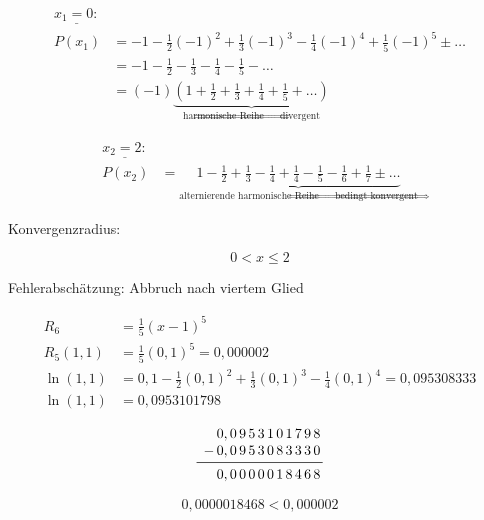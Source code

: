 \begin{align*}
    \underline{x_1 = 0:} \\
    P(x_1) &= -1 - \frac{1}{2} {(-1)}^2 + \frac{1}{3} {(-1)}^3 - \frac{1}{4} {(-1)}^4 + \frac{1}{5} {(-1)}^5 \pm \ldots \\
    &= -1 - \frac{1}{2} - \frac{1}{3} - \frac{1}{4} - \frac{1}{5} - \ldots \\
    &= (-1) \underbrace{\left( 1 + \frac{1}{2} + \frac{1}{3} + \frac{1}{4} + \frac{1}{5} + \ldots \right)}_{\text{harmonische Reihe \(\Rightarrow\) divergent}}
\end{align*}

\begin{align*}
    \underline{x_2 = 2:} \\
    P(x_2) &= \underbrace{1 - \frac{1}{2} + \frac{1}{3} - \frac{1}{4} + \frac{1}{4} - \frac{1}{5} - \frac{1}{6} + \frac{1}{7} \pm \ldots}_{\text{alternierende harmonische Reihe \(\Rightarrow\) bedingt konvergent}}
\end{align*}

Konvergenzradius:

\[
    0 < x \leq 2
\]

Fehlerabschätzung: Abbruch nach viertem Glied

\begin{align*}
    R_6 &= \frac{1}{5} {(x - 1)}^5 \\
    R_5(1,1) &= \frac{1}{5} {(0,1)}^5 = 0,000002 \\
    \ln (1,1) &= 0,1 - \frac{1}{2} {(0,1)}^2 + \frac{1}{3} {(0,1)}^3 - \frac{1}{4} {(0,1)}^4 = 0,095308333 \\
    \ln (1,1) &= 0,0953101798
\end{align*}

\[
    \begin{array}{*{12}{c@{\,}}}
        & 0, & 0 & 9 & 5 & 3 & 1 & 0 & 1 & 7 & 9 & 8 \\
        - & 0, & 0 & 9 & 5 & 3 & 0 & 8 & 3 & 3 & 3 & 0 \\
        \midrule
        & 0, & 0 & 0 & 0 & 0 & 0 & 1 & 8 & 4 & 6 & 8
    \end{array}
\]
    
\[
    0,0000018468 < 0,000002  
\]
